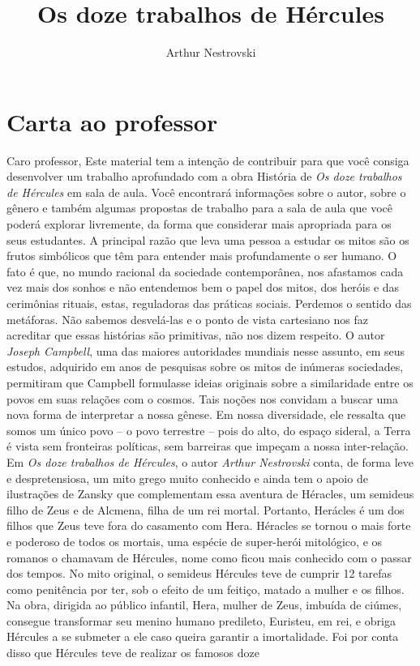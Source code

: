 \documentclass[11pt]{extarticle}
\newcommand{\AutorLivro}{Arthur Nestrovski}
\newcommand{\TituloLivro}{Os doze trabalhos de Hércules}
\newcommand{\colaborador}{Gabriela Karam}
\begin{document}
\title{\TituloLivro}
\author{\AutorLivro}
\def\authornotes{\colaborador}

\date{}
\maketitle


\tableofcontents

\section{Carta ao professor}

Caro professor,
Este material tem a intenção de contribuir para que você consiga desenvolver um trabalho aprofundado com a obra História de \textit{Os doze trabalhos de Hércules} em sala de aula. Você encontrará informações sobre o autor, sobre o gênero e também algumas propostas de trabalho para a sala de aula que você poderá explorar livremente, da forma que considerar mais apropriada para os seus estudantes. A principal razão que leva uma pessoa a estudar os mitos são os frutos simbólicos que têm para entender mais profundamente o ser humano. O fato é que, no mundo racional da sociedade contemporânea, nos afastamos cada vez mais dos sonhos e não entendemos bem o papel dos mitos, dos heróis e das cerimônias rituais, estas, reguladoras das práticas sociais. Perdemos o sentido das metáforas. Não sabemos desvelá-las e o ponto de vista cartesiano nos faz acreditar que essas histórias são primitivas, não nos dizem respeito. O autor \textit{Joseph Campbell}, uma das maiores autoridades mundiais nesse assunto, em seus estudos, adquirido em anos de pesquisas sobre os mitos de inúmeras sociedades, permitiram que Campbell formulasse ideias originais sobre a similaridade entre os povos em suas relações com o cosmos. Tais noções nos convidam a buscar uma nova forma de interpretar a nossa gênese. Em nossa diversidade, ele ressalta que somos um único povo – o povo terrestre – pois do alto, do espaço sideral, a Terra é vista sem fronteiras políticas, sem barreiras que impeçam a nossa inter-relação. Em \textit{Os doze trabalhos de Hércules}, o autor \textit{Arthur Nestrovski} conta, de forma leve e despretensiosa, um mito grego muito conhecido e ainda tem o apoio de ilustrações de Zansky que complementam essa aventura de Héracles, um semideus filho de Zeus e de Alcmena, filha de um rei mortal. Portanto, Herácles é um dos filhos que Zeus teve fora do casamento com Hera. Héracles se tornou o mais forte e poderoso de todos os mortais, uma espécie de super-herói mitológico, e os romanos o chamavam de Hércules, nome como ficou mais conhecido com o passar dos tempos. No mito original, o semideus Hércules teve de cumprir 12 tarefas como penitência por ter, sob o efeito de um feitiço, matado a mulher e os filhos. Na obra, dirigida ao público infantil, Hera, mulher de Zeus, imbuída de ciúmes, consegue transformar seu menino humano predileto, Euristeu, em rei, e obriga Hércules a se submeter a ele caso queira garantir a imortalidade. Foi por conta disso que Hércules teve de realizar os famosos doze 
\end{document}
